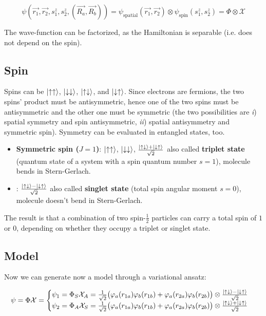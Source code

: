 	$$\psi(\vec{r_1},\vec{r_2},s_1^z,s_2^z,(\vec{R_a},\vec{R_b}))=\psi_{\text{spatial}}(\vec{r_1},\vec{r_2})\otimes\psi_{\text{spin}}(s_1^z,s_2^z)=\Phi\otimes\mathcal{X}$$

	The wave-function can be factorized, as the Hamiltonian is separable (i.e. does not depend on the spin).

	\subsection{Spin}
	Spins can be $\ket{\uparrow\uparrow}$, $\ket{\downarrow\downarrow}$, $\ket{\uparrow\downarrow}$, and $\ket{\downarrow\uparrow}$.
	Since electrons are fermions, the two spins' product must be antisymmetric, hence one of the two spins must be antisymmetric and the other one must be symmetric (the two possibilities are \textit{i}) spatial symmetry and spin antisymmetric, \textit{ii}) spatial antisymmetry and symmetric spin).
	Symmetry can be evaluated in entangled states, too.

	\begin{multicols}{2}
	\begin{itemize}
		 \item \textbf{Symmetric spin ($J=1$)}: $\ket{\uparrow\uparrow}$, $\ket{\downarrow\downarrow}$, $\frac{\ket{\uparrow\downarrow}+\ket{\downarrow\uparrow}}{\sqrt{2}}$ also called \textbf{triplet state} (quantum state of a system with a spin quantum number $s=1$), molecule bends in Stern-Gerlach.
		 \item {}: $\frac{\ket{\uparrow\downarrow}-\ket{\downarrow\uparrow}}{\sqrt{2}}$ also called \textbf{singlet state} (total spin angular moment $s=0$), molecule doesn't bend in Stern-Gerlach.
	\end{itemize}
	\end{multicols}

	The result is that a combination of two spin-$\frac{1}{2}$ particles can carry a total spin of $1$ or $0$, depending on whether they occupy a triplet or singlet state.

	\subsection{Model}
	Now we can generate now a model through a variational ansatz:

	$$\psi=\Phi \mathcal{X}=\begin{cases}\psi_1=\Phi_S \mathcal{X}_A = \frac{1}{\sqrt{2}} \big(\varphi_a(r_{1a}) \varphi_b (r_{1b})+\varphi_a (r_{2a}) \varphi_b (r_{2b})\big) \otimes\frac{\ket{\uparrow\downarrow}-\ket{\downarrow\uparrow}}{\sqrt{2}}\\\psi_2=\Phi_A\mathcal{X}_S = \frac{1}{\sqrt{2}} \big(\varphi_a(r_{1a}) \varphi_b (r_{1b})+\varphi_a (r_{2a}) \varphi_b (r_{2b})\big) \otimes\frac{\ket{\uparrow\downarrow}+\ket{\downarrow\uparrow}}{\sqrt{2}}\\\end{cases}$$

